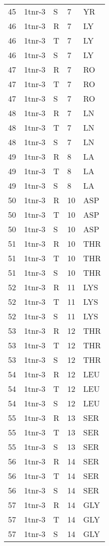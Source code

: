 \begin{tiny}
\begin{longtable}[l]{l|l|l|l|l}
	45 & 1tnr-3 & S & 7 & YR \\
	46 & 1tnr-3 & R & 7 & LY \\
	46 & 1tnr-3 & T & 7 & LY \\
	46 & 1tnr-3 & S & 7 & LY \\
	47 & 1tnr-3 & R & 7 & RO \\
	47 & 1tnr-3 & T & 7 & RO \\
	47 & 1tnr-3 & S & 7 & RO \\
	48 & 1tnr-3 & R & 7 & LN \\
	48 & 1tnr-3 & T & 7 & LN \\
	48 & 1tnr-3 & S & 7 & LN \\
	49 & 1tnr-3 & R & 8 & LA \\
	49 & 1tnr-3 & T & 8 & LA \\
	49 & 1tnr-3 & S & 8 & LA \\
	50 & 1tnr-3 & R & 10 & ASP \\
	50 & 1tnr-3 & T & 10 & ASP \\
	50 & 1tnr-3 & S & 10 & ASP \\
	51 & 1tnr-3 & R & 10 & THR \\
	51 & 1tnr-3 & T & 10 & THR \\
	51 & 1tnr-3 & S & 10 & THR \\
	52 & 1tnr-3 & R & 11 & LYS \\
	52 & 1tnr-3 & T & 11 & LYS \\
	52 & 1tnr-3 & S & 11 & LYS \\
	53 & 1tnr-3 & R & 12 & THR \\
	53 & 1tnr-3 & T & 12 & THR \\
	53 & 1tnr-3 & S & 12 & THR \\
	54 & 1tnr-3 & R & 12 & LEU \\
	54 & 1tnr-3 & T & 12 & LEU \\
	54 & 1tnr-3 & S & 12 & LEU \\
	55 & 1tnr-3 & R & 13 & SER \\
	55 & 1tnr-3 & T & 13 & SER \\
	55 & 1tnr-3 & S & 13 & SER \\
	56 & 1tnr-3 & R & 14 & SER \\
	56 & 1tnr-3 & T & 14 & SER \\
	56 & 1tnr-3 & S & 14 & SER \\
	57 & 1tnr-3 & R & 14 & GLY \\
	57 & 1tnr-3 & T & 14 & GLY \\
	57 & 1tnr-3 & S & 14 & GLY \\

\end{longtable}
\end{tiny}
